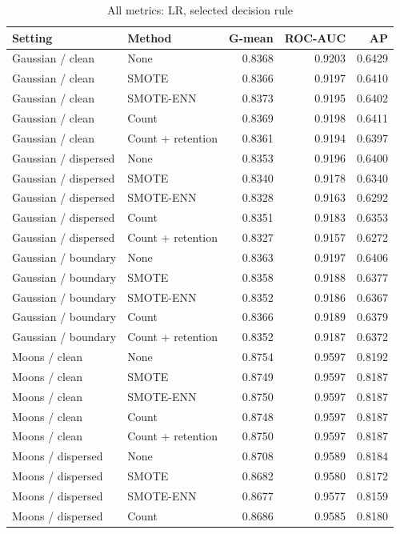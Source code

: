 \begin{table}[htbp]
\caption{All metrics: LR, selected decision rule}
\centering\small
\begin{tabular}{llrrr}
\hline
Setting & Method & G-mean & ROC-AUC & AP\\
\hline
Gaussian / clean & None & 0.8368 & 0.9203 & 0.6429 \\
Gaussian / clean & SMOTE & 0.8366 & 0.9197 & 0.6410 \\
Gaussian / clean & SMOTE-ENN & 0.8373 & 0.9195 & 0.6402 \\
Gaussian / clean & Count & 0.8369 & 0.9198 & 0.6411 \\
Gaussian / clean & Count + retention & 0.8361 & 0.9194 & 0.6397 \\
Gaussian / dispersed & None & 0.8353 & 0.9196 & 0.6400 \\
Gaussian / dispersed & SMOTE & 0.8340 & 0.9178 & 0.6340 \\
Gaussian / dispersed & SMOTE-ENN & 0.8328 & 0.9163 & 0.6292 \\
Gaussian / dispersed & Count & 0.8351 & 0.9183 & 0.6353 \\
Gaussian / dispersed & Count + retention & 0.8327 & 0.9157 & 0.6272 \\
Gaussian / boundary & None & 0.8363 & 0.9197 & 0.6406 \\
Gaussian / boundary & SMOTE & 0.8358 & 0.9188 & 0.6377 \\
Gaussian / boundary & SMOTE-ENN & 0.8352 & 0.9186 & 0.6367 \\
Gaussian / boundary & Count & 0.8366 & 0.9189 & 0.6379 \\
Gaussian / boundary & Count + retention & 0.8352 & 0.9187 & 0.6372 \\
Moons / clean & None & 0.8754 & 0.9597 & 0.8192 \\
Moons / clean & SMOTE & 0.8749 & 0.9597 & 0.8187 \\
Moons / clean & SMOTE-ENN & 0.8750 & 0.9597 & 0.8187 \\
Moons / clean & Count & 0.8748 & 0.9597 & 0.8187 \\
Moons / clean & Count + retention & 0.8750 & 0.9597 & 0.8187 \\
Moons / dispersed & None & 0.8708 & 0.9589 & 0.8184 \\
Moons / dispersed & SMOTE & 0.8682 & 0.9580 & 0.8172 \\
Moons / dispersed & SMOTE-ENN & 0.8677 & 0.9577 & 0.8159 \\
Moons / dispersed & Count & 0.8686 & 0.9585 & 0.8180 \\

\end{tabular}
\end{table}

